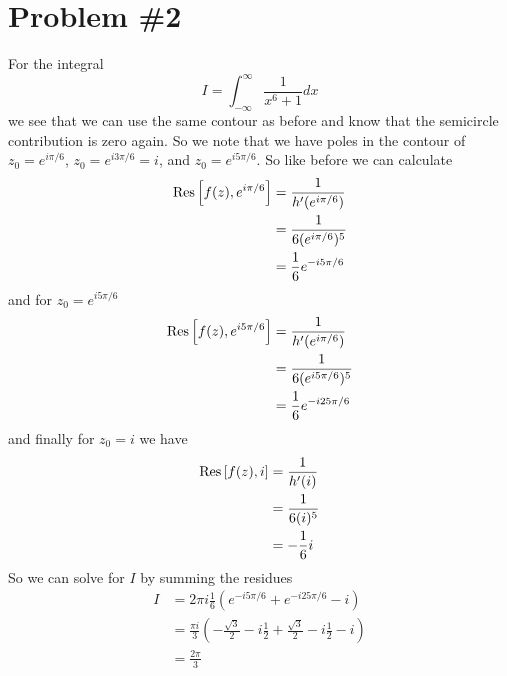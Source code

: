 \documentclass[11pt]{article}
\numberwithin{equation}{section}
\begin{document}
\pagebreak

\section{Problem \#2}
For the integral 
$$I = \int_{-\infty}^{\infty}\frac{1}{x^6+1}dx$$ 
we see that we can use the same contour as before and know that the semicircle contribution
is zero again. So we note that we have poles in the contour of $z_0=e^{i\pi/6}$, 
$z_0=e^{i3\pi/6}=i$, and $z_0=e^{i5\pi/6}$. So like before we can calculate
\begin{align*}
\textnormal{Res}\left[{f(z)},{e^{i\pi/6}}\right] &= \frac{1}{h'(e^{i\pi/6})}\\
&= \frac{1}{6(e^{i\pi/6})^5}\\
&= \frac{1}{6}e^{-i5\pi/6}
\end{align*}
and for $z_0=e^{i5\pi/6}$
\begin{align*}
\textnormal{Res}\left[{f(z)},{e^{i5\pi/6}}\right] &= \frac{1}{h'(e^{i\pi/6})}\\
&= \frac{1}{6(e^{i5\pi/6})^5}\\
&= \frac{1}{6}e^{-i25\pi/6}
\end{align*}
and finally for $z_0=i$ we have
\begin{align*}
\textnormal{Res}\left[{f(z)},{i}\right] &= \frac{1}{h'(i)}\\
&= \frac{1}{6(i)^5}\\
&= -\frac{1}{6}i
\end{align*}
So we can solve for $I$ by summing the residues 
\begin{align*}
I &= 2\pi{i}\frac{1}{6}\left(e^{-i5\pi/6}+e^{-i25\pi/6}-i\right)\\
&= \frac{\pi{i}}{3}\left(-\frac{\sqrt{3}}{2} - i\frac{1}{2} + \frac{\sqrt{3}}{2} -i\frac{1}{2} - i\right) \\
&= \frac{2\pi}{3}
\end{align*}

\pagebreak
\end{document}
